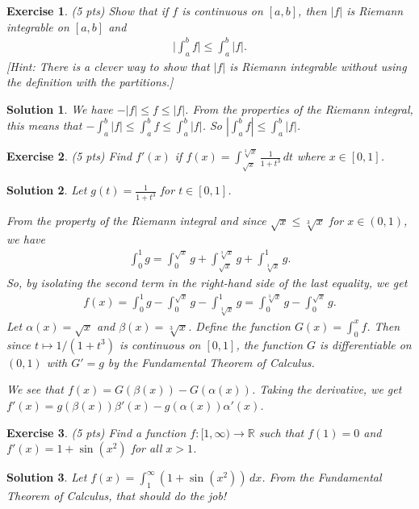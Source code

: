 \documentclass[12pt]{article}
\newcommand{\bR}{\mathbb{R}}
\newcommand{\ra}{\rightarrow}
\theoremstyle{plain}
\newtheorem{exer}{\textbf{Exercise}}}
\theoremstyle{plain}
\newtheorem*{sol}{\textbf{Solution}}}
\theoremstyle{plain}
\theoremstyle{plain}
\begin{document}
\begin{exer}
(5 pts)
Show that if $f$ is continuous on $[a, b]$, then $|f|$ is Riemann integrable on $[a, b]$ and
	\begin{align*}
	\Big| \int_a^b f \Big| \leq \int_a^b |f| .
	\end{align*}
[Hint: There is a clever way to show that $|f|$ is Riemann integrable without using the definition with the partitions.]
\end{exer}
\begin{sol}
We have $-|f| \leq f \leq |f|$. From the properties of the Riemann integral, this means that $-\int_a^b |f| \leq \int_a^b f \leq \int_a^b |f|$. So $|\int_a^b f | \leq \int_a^b |f|$.
\end{sol}

\begin{exer}
(5 pts)
Find $f'(x)$ if $f (x) = \displaystyle\int_{\sqrt{x}}^{\sqrt[3]{x}} \frac{1}{1 + t^3} \, dt$ where $x \in [0, 1]$.
\end{exer}
\begin{sol}
Let $g(t) = \frac{1}{1 + t^3}$ for $t \in [0, 1]$.

From the property of the Riemann integral and since $\sqrt{x} \leq \sqrt[3]{x}$ for $x \in (0, 1)$, we have
	\begin{align*}
	\int_0^1 g = \int_0^{\sqrt{x}} g + \int_{\sqrt{x}}^{\sqrt[3]{x}} g + \int_{\sqrt[3]{x}}^{1} g .
	\end{align*}
So, by isolating the second term in the right-hand side of the last equality, we get
	\begin{align*}
	f(x) = \int_0^1 g- \int_0^{\sqrt{x}} g - \int_{\sqrt[3]{x}}^1 g = \int_0^{\sqrt[3]{x}} g - \int_0^{\sqrt{x}} g .
	\end{align*}
Let $\alpha (x) = \sqrt{x}$ and $\beta (x) = \sqrt[3]{x}$. Define the function $G (x) = \int_0^x f$. Then since $t \mapsto 1/(1 + t^3)$ is continuous on $[0, 1]$, the function $G$ is differentiable on $(0, 1)$ with $G' = g$ by the Fundamental Theorem of Calculus. 

We see that $f(x) = G(\beta (x)) - G (\alpha (x))$. Taking the derivative, we get $f'(x) = g (\beta (x)) \beta'(x) - g (\alpha (x)) \alpha'(x)$.
\end{sol}

\begin{exer}
(5 pts)
Find a function $f : [1, \infty ) \ra \bR$ such that $f(1) = 0$ and $f'(x) = 1 + \sin (x^2 )$ for all $x > 1$.
\end{exer}
\begin{sol}
Let $f(x) = \int_1^\infty (1 + \sin (x^2)) \, dx$. From the Fundamental Theorem of Calculus, that should do the job!
\end{sol}
\end{document}
